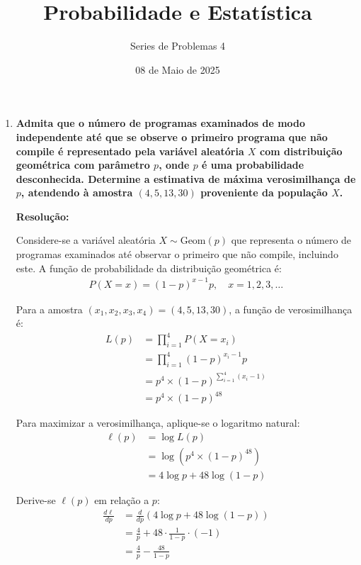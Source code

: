 \documentclass[a4paper,12pt]{article}
\author{Series de Problemas 4}
\begin{document}
\title{Probabilidade e Estatística}
\date{08 de Maio de 2025}
\maketitle

\begin{enumerate}
    \item \textbf{Admita que o número de programas examinados de modo independente até que se observe o primeiro programa que não compile é representado pela variável aleatória \( X \) com distribuição geométrica com parâmetro \( p \), onde \( p \) é uma probabilidade desconhecida. Determine a estimativa de máxima verosimilhança de \( p \), atendendo à amostra \( (4, 5, 13, 30) \) proveniente da população \( X \).}

    \vspace{0.3cm}

    \begin{mdframed}[backgroundcolor=gray!10, linewidth=0pt, innertopmargin=10pt, innerbottommargin=10pt]
    \textbf{Resolução:}

    Considere-se a variável aleatória $X \sim \text{Geom}(p)$ que representa o número de programas examinados até observar o primeiro que não compile, incluindo este. A função de probabilidade da distribuição geométrica é:
    \begin{align*}
    P(X = x) = (1 - p)^{x - 1} p, \quad x = 1, 2, 3, \ldots
    \end{align*}

    Para a amostra $(x_1, x_2, x_3, x_4) = (4, 5, 13, 30)$, a função de verosimilhança é:
    \begin{align*}
    L(p) &= \prod_{i=1}^4 P(X = x_i) \\
    &= \prod_{i=1}^4 (1 - p)^{x_i - 1} p \\
    &= p^4 \times (1 - p)^{\sum_{i=1}^4 (x_i - 1)} \\
    &= p^4 \times (1 - p)^{48}
    \end{align*}

    Para maximizar a verosimilhança, aplique-se o logaritmo natural:
    \begin{align*}
    \ell(p) &= \log L(p) \\
    &= \log \left( p^4 \times (1 - p)^{48} \right) \\
    &= 4 \log p + 48 \log(1-p)
    \end{align*}

    Derive-se $\ell(p)$ em relação a $p$:
    \begin{align*}
    \frac{d\ell}{dp} &= \frac{d}{dp} \left( 4 \log p + 48 \log(1-p) \right) \\
    &= \frac{4}{p} + 48 \cdot \frac{1}{1-p} \cdot (-1) \\
    &= \frac{4}{p} - \frac{48}{1-p}
    \end{align*}


\end{mdframed}
\end{enumerate}
\end{document}
